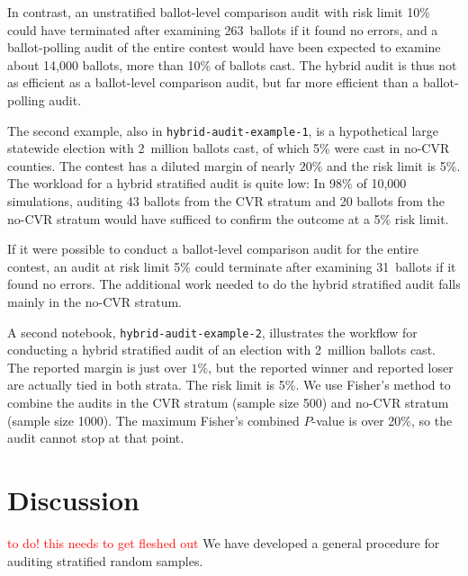 \documentclass[runningheads]{llncs}
\newcommand{\comment}[1]{\textcolor{red}{\sc #1}}
\begin{document}
In contrast, an unstratified ballot-level comparison audit with risk limit 10\% could have terminated
after examining 263~ballots if it found no errors, and a ballot-polling audit of the entire contest 
would have been expected to examine about 14,000 ballots, more than 10\% of ballots cast.
The hybrid audit is thus not as efficient as a ballot-level comparison audit, but far more efficient than
a ballot-polling audit.
%

The second example, also in \texttt{hybrid-audit-example-1}, 
is a hypothetical large statewide election with 
2~million ballots cast, of which 5\% were cast in no-CVR counties.
The contest has a diluted margin of nearly $20\%$ and the risk limit is 5\%.
The workload for a hybrid stratified audit is quite low:
In 98\% of 10,000 simulations, auditing 43 ballots from the 
CVR stratum and 20 ballots from the no-CVR stratum
would have sufficed to confirm the outcome at a 5\% risk limit.

If it were possible to conduct a ballot-level comparison audit for the entire contest, 
an audit at risk limit 5\% could terminate after examining 31~ballots if it found no errors.
The additional work needed to do the hybrid stratified audit falls mainly in the no-CVR stratum.

A second notebook, \texttt{hybrid-audit-example-2}, illustrates the 
workflow for conducting a hybrid stratified audit of an election with 2~million ballots cast.
The reported margin is just over $1\%$, but the reported winner
and reported loser are actually tied in both strata.  
The risk limit is 5\%.
We use Fisher's method to combine the audits in the CVR stratum (sample size 500) 
and no-CVR stratum (sample size 1000).
The maximum Fisher's combined $P$-value is over 20\%, so the audit cannot stop at that point.



\section{Discussion} \label{sec:discussion}

\comment{to do! this needs to get fleshed out}
We have developed a general procedure for auditing stratified random samples.
\end{document}
